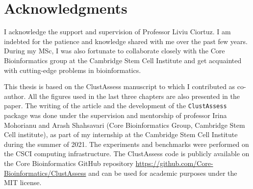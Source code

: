 \chapter*{Acknowledgments} 

I acknowledge the support and supervision of Professor Liviu Ciortuz. I am indebted for the patience and knowledge shared with me over the past few years. During my MSc, I was also fortunate to collaborate closely with the Core Bioinformatics group at the Cambridge Stem Cell Institute and get acquainted with cutting-edge problems in bioinformatics. 

This thesis is based on the ClustAssess manuscript \cite{clustassess} to which I contributed as co-author. All the figures used in the last three chapters are also presented in the paper. The writing of the article and the development of the \verb|ClustAssess| package was done under the supervision and mentorship of professor Irina Mohorianu and Arash Shahsavari (Core Bioinformatics Group, Cambridge Stem Cell institute), as part of my internship at the Cambridge Stem Cell Institute during the summer of 2021. The experiments and benchmarks were performed on the CSCI computing infrastructure. The ClustAssess code is publicly available on the Core Bioinformatics GitHub repository \url{https://github.com/Core-Bioinformatics/ClustAssess} and can be used for academic purposes under the MIT license.